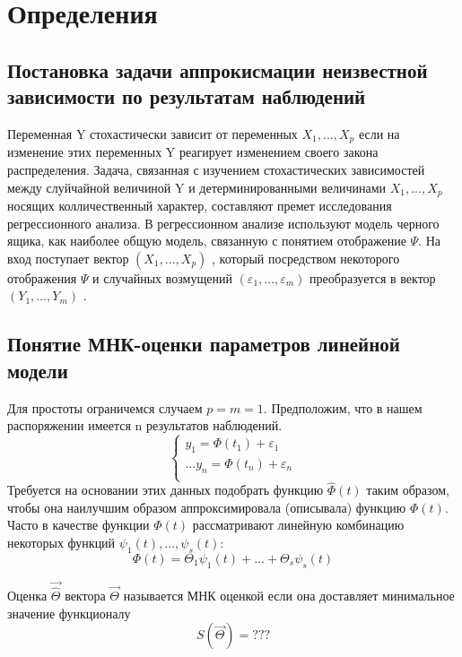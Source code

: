 \chapter{Определения}

\section{Постановка задачи аппрокисмации неизвестной зависимости по результатам наблюдений}
Переменная Y стохастически зависит от переменных $X_1,...,X_p$ если на изменение этих переменных Y реагирует изменением своего закона распределения. Задача, связанная с изучением стохастических зависимостей между слуйчайной величиной Y и детерминированными величинами $X_1,...,X_p$ носящих колличественный характер, составляют премет исследования регрессионного анализа. В регрессионном анализе используют модель черного ящика, как наиболее общую модель, связанную с понятием отображение $\Psi$.
На вход поступает вектор $(X_1,...,X_p)$ , который посредством некоторого отображения $\Psi$ и случайных возмущений $(\varepsilon_1,...,\varepsilon_m)$ преобразуется в вектор $(Y_1,...,Y_m)$ .

\section{Понятие МНК-оценки параметров линейной модели}

Для простоты ограничемся случаем $p = m = 1$. Предположим, что в нашем распоряжении имеется n результатов наблюдений.
\begin{equation}
 \begin{cases}
   y_1 = \Phi(t_1) + \varepsilon_1\\
   ...
   y_n = \Phi(t_n) + \varepsilon_n\\
 \end{cases}
\end{equation}
Требуется на основании этих данных подобрать функцию $\hat{\Phi}(t)$ таким образом, чтобы она наилучшим образом аппроксимировала (описывала) функцию $\Phi(t)$. Часто в качестве функции $\Phi(t)$ рассматривают линейную комбинацию некоторых функций $\psi_1(t),...,\psi_s(t)$:
$$\Phi(t) = \Theta_1\psi_1(t) + ... + \Theta_s\psi_s(t)$$

Оценка $\vec{\hat{\Theta}}$ вектора $\vec{\Theta}$ называется МНК оценкой если она доставляет минимальное значение функционалу
$$S(\vec{\Theta}) = ??? $$


